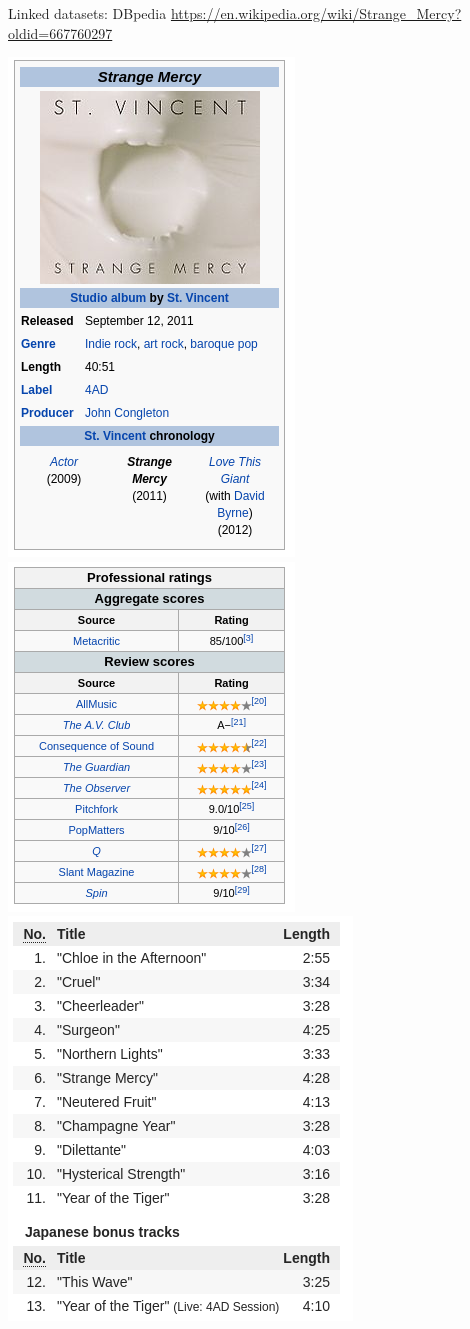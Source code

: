 \documentclass{beamer}
\begin{document}
\begin{frame}{Linked datasets: DBpedia}
\url{https://en.wikipedia.org/wiki/Strange_Mercy?oldid=667760297}

\pause
\includegraphics[width=.32\textwidth]{strange_mercy1.png}
\pause
\includegraphics[width=.32\textwidth]{strange_mercy2.png}
\pause
\includegraphics[width=.32\textwidth]{strange_mercy3.png}
\end{frame}
\end{document}
